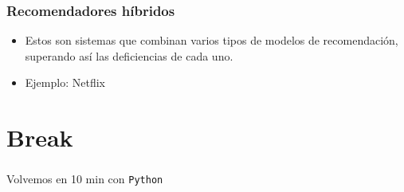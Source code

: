 \documentclass[
  shownotes,
  xcolor={svgnames},
  hyperref={colorlinks,citecolor=DarkBlue,linkcolor=Black,urlcolor=DarkBlue}
  , aspectratio=169]{beamer}
\begin{document}
\begin{frame}
\frametitle{Recomendadores híbridos}

   
   \begin{itemize}
\item Estos son sistemas que combinan varios tipos de modelos de recomendación, superando así las deficiencias de cada uno.
\medskip
\item  Ejemplo: Netflix 
   \end{itemize}


   
\end{frame}    
    

\section{Break}
\begin{frame}
\frametitle{}

\begin{centering}
\huge
\textcolor{andesred}{Volvemos en 10 min con \texttt{Python} }

\end{centering}

\end{frame}



    
\end{document}

